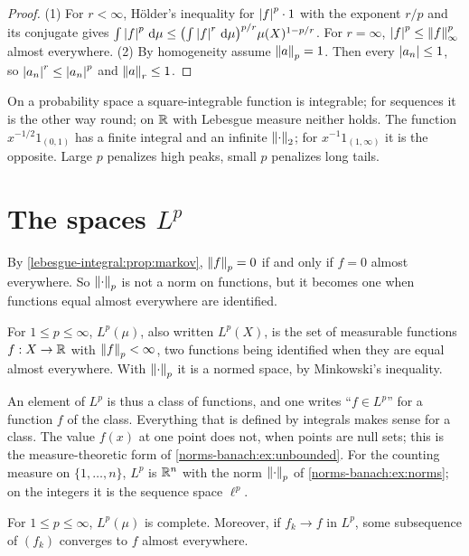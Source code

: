 \begin{notechapter}
\begin{proof}
(1) For $r < \infty$, H\"older's inequality for $\left|f\right|^p\cdot1$ with the
exponent $r/p$ and its conjugate gives
$\int\left|f\right|^p\,\mathrm{d}\mu
\leq\bigl(\int\left|f\right|^r\,\mathrm{d}\mu\bigr)^{p/r}\mu(X)^{1 - p/r}$. For
$r = \infty$, $\left|f\right|^p\leq\left\|f\right\|_\infty^p$ almost everywhere. (2) By
homogeneity assume $\left\|a\right\|_p = 1$. Then every $\left|a_n\right|\leq1$, so
$\left|a_n\right|^r\leq\left|a_n\right|^p$ and $\left\|a\right\|_r\leq1$.
\end{proof}

\begin{pitfall}
On a probability space a square-integrable function is integrable; for
sequences it is the other way round; on $\mathbb{R}$ with Lebesgue measure
neither holds. The function $x^{-1/2}1_{(0, 1)}$ has a finite integral
and an infinite $\left\|\cdot\right\|_2$; for $x^{-1}1_{(1, \infty)}$ it is the
opposite. Large $p$ penalizes high peaks, small $p$ penalizes long tails.
\end{pitfall}

\section{The spaces $L^p$}\label{lp-spaces:sec:spaces}

By \cref{lebesgue-integral:prop:markov}, $\left\|f\right\|_p = 0$ if and only if
$f = 0$ almost everywhere. So $\left\|\cdot\right\|_p$ is not a norm on functions,
but it becomes one when functions equal almost everywhere are
identified.

\begin{definition}[$L^p$]\label{lp-spaces:def:lp}
For $1\leq p\leq\infty$, $L^p(\mu)$, also written $L^p(X)$, is the set of
measurable functions $f:X\to\mathbb{R}$ with $\left\|f\right\|_p < \infty$, two functions
being identified when they are equal almost everywhere. With
$\left\|\cdot\right\|_p$ it is a normed space, by Minkowski's inequality.
\end{definition}

An element of $L^p$ is thus a class of functions, and one writes
``$f\in L^p$'' for a function $f$ of the class. Everything that is
defined by integrals makes sense for a class. The value $f(x)$ at one
point does not, when points are null sets; this is the measure-theoretic
form of \cref{norms-banach:ex:unbounded}. For the counting measure on
$\{1,\dots,n\}$, $L^p$ is $\mathbb{R}^n$ with the norm $\left\|\cdot\right\|_p$ of
\cref{norms-banach:ex:norms}; on the integers it is the sequence space
$\ell^p$.

\begin{theorem}\label{lp-spaces:thm:complete}
For $1\leq p\leq\infty$, $L^p(\mu)$ is complete. Moreover, if
$f_k\to f$ in $L^p$, some subsequence of $(f_k)$ converges to $f$ almost
everywhere.
\end{theorem}


\end{notechapter}
